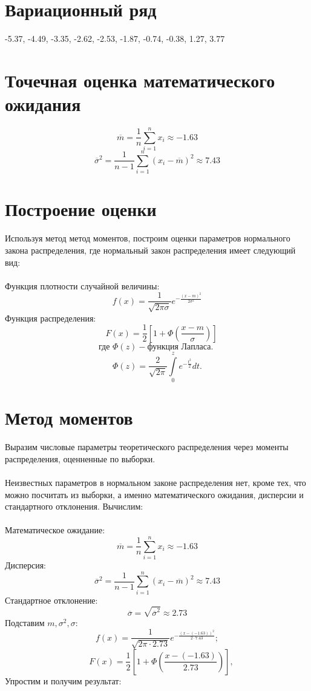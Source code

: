 \documentclass{article}
\begin{document}
\section{Вариационный ряд}
-5.37, -4.49, -3.35, -2.62, -2.53, -1.87, -0.74, -0.38, 1.27, 3.77
\section{Точечная оценка математического ожидания}
\[\overline{m} = \frac{1}{n}\sum_{i=1}^{n}x_i \approx -1.63\]
\[\overline{\sigma}^2 = \frac{1}{n-1}\sum_{i=1}^{n}(x_i-\overline{m})^2 \approx 7.43\]
\section{Построение оценки}
Используя метод метод моментов, построим оценки параметров нормального закона распределения, где нормальный закон распределения имеет следующий вид:
\\ \\
Функция плотности случайной величины:
\[f(x) = \frac{1}{\sqrt{2 \pi \sigma}} e^{- \frac{(x-m)^2}{2 \sigma^2}}\]
Функция распределения:
\[\quad F(x) = \frac{1}{2} \left[1 + \Phi\left(\frac{x-m}{\sigma}\right)\right]\]
\[\text{где } \Phi(z) - \text{функция Лапласа. }\]
\[\Phi(z) = \frac{2}{\sqrt{2\pi}} \int\limits_0^z e^{-\frac{t^2}{2}} dt.\]

\section{Метод моментов}

Выразим числовые параметры теоретического распределения через моменты распределения, оценненные по выборки. 
\\ \\
Неизвестных параметров в нормальном законе распределения нет, кроме тех, что можно посчитать из выборки, а именно математического ожидания, дисперсии и стандартного отклонения. Вычислим:
\\ \\
Математическое ожидание:
\[\overline{m} = \frac{1}{n}\sum_{i=1}^{n}x_i \approx -1.63\]
Дисперсия:
\[\overline{\sigma}^2 = \frac{1}{n-1}\sum_{i=1}^{n}(x_i-\overline{m})^2 \approx 7.43\]
Стандартное отклонение:
\[\overline{\sigma} = \sqrt{\overline{\sigma}^2} \approx 2.73 \]
Подставим $m, \sigma^2, \sigma:$
\[f(x) = \frac{1}{\sqrt{2 \pi \cdot 2.73}} e^{- \frac{(x - (-1.63))^2}{2 \cdot 7.43}};\]
\[\quad F(x) = \frac{1}{2} \left[1 + \Phi\left(\frac{x - (-1.63)}{2.73}\right)\right],\]
Упростим и получим результат:
\end{document}
